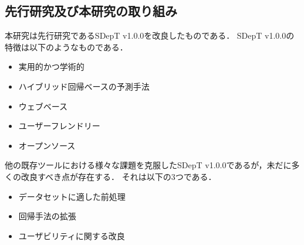 \subsection{先行研究及び本研究の取り組み}\label{SDepT-v1.0.0}
本研究は先行研究であるSDepT v1.0.0\cite{Xiao2024ISSRE}を改良したものである．
SDepT v1.0.0の特徴は以下のようなものである．
\begin{itemize}
  \item 実用的かつ学術的
  \item ハイブリッド回帰ベースの予測手法
  \item ウェブベース
  \item ユーザーフレンドリー
  \item オープンソース
\end{itemize}

他の既存ツールにおける様々な課題を克服したSDepT v1.0.0であるが，未だに多くの改良すべき点が存在する．
それは以下の3つである．
\begin{itemize}
  \item データセットに適した前処理
  \item 回帰手法の拡張
  \item ユーザビリティに関する改良
\end{itemize}

